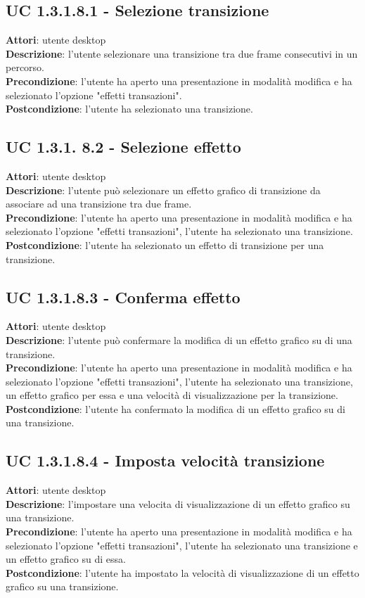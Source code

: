 \subsection{UC 1.3.1.8.1 - Selezione transizione}{
	\label{uc1.3.1..8.1}
	\textbf{Attori}: utente desktop \\
	\textbf{Descrizione}: l'utente selezionare una transizione tra due frame consecutivi in un percorso. \\
	\textbf{Precondizione}: l'utente ha aperto una presentazione in modalità modifica e ha selezionato l'opzione "effetti transazioni".	\\
	\textbf{Postcondizione}: l'utente ha selezionato una transizione.	\\
}
\subsection{UC 1.3.1. 8.2 - Selezione effetto}{
	\label{uc1.3.1.8.2}
	\textbf{Attori}: utente desktop \\
	\textbf{Descrizione}: l'utente può selezionare un effetto grafico di transizione da associare ad una transizione tra due frame. \\
	\textbf{Precondizione}: l'utente ha aperto una presentazione in modalità modifica e ha selezionato l'opzione "effetti transazioni", l'utente ha selezionato una transizione.	\\
	\textbf{Postcondizione}: l'utente ha selezionato un effetto di transizione per una transizione.	\\
}
\subsection{UC 1.3.1.8.3 - Conferma effetto}{
	\label{uc1.3.1.8.3}
	\textbf{Attori}: utente desktop \\
	\textbf{Descrizione}: l'utente può confermare la modifica di un effetto grafico su di una transizione. \\
	\textbf{Precondizione}: l'utente ha aperto una presentazione in modalità modifica e ha selezionato l'opzione "effetti transazioni", l'utente ha selezionato una transizione, un effetto grafico per essa e una velocità di visualizzazione per la transizione.	\\
	\textbf{Postcondizione}: l'utente ha confermato la modifica di un effetto grafico su di una transizione.	\\
}
\subsection{UC 1.3.1.8.4 - Imposta velocità transizione}{
	\label{uc1.3.1..8.4}
	\textbf{Attori}: utente desktop \\
	\textbf{Descrizione}: l'impostare una velocita di visualizzazione di un effetto grafico su una transizione. \\
	\textbf{Precondizione}: l'utente ha aperto una presentazione in modalità modifica e ha selezionato l'opzione "effetti transazioni", l'utente ha selezionato una transizione e un effetto grafico su di essa.	\\
	\textbf{Postcondizione}: l'utente ha impostato la velocità di visualizzazione di un effetto grafico su una transizione.	\\
}
